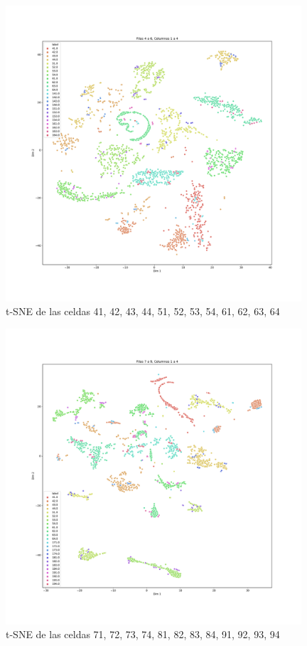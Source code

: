 \begin{figure}[H]
    \centering
    \includegraphics[width=110mm, angle=0]{4/Fotos/tsne_TimeGAN_46-14.pdf}
    \captionsetup{justification=centering,margin=1.25cm}
    \caption{t-SNE de las celdas 41, 42, 43, 44, 51, 52, 53, 54, 61, 62, 63, 64}
    \label{fig:46-14}
\end{figure}

\begin{figure}[H]
    \centering
    \includegraphics[width=110mm, angle=0]{4/Fotos/tsne_TimeGAN_79-14.pdf}
    \captionsetup{justification=centering,margin=1.25cm}
    \caption{t-SNE de las celdas 71, 72, 73, 74, 81, 82, 83, 84, 91, 92, 93, 94}
    \label{fig:79-14}
\end{figure}

